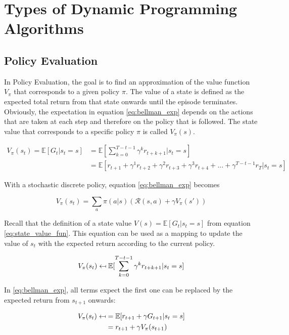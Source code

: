 \section{Types of Dynamic Programming Algorithms}

\subsection{Policy Evaluation}
\label{subsection:policy_evaluation}

In Policy Evaluation, the goal is to find an approximation of the value function $V_\pi$ that corresponds to a given policy $\pi$. The value of a state is defined as the expected total return from that state onwards until the episode terminates. Obviously, the expectation in equation \ref{eq:bellman_exp} depends on the actions that are taken at each step and therefore on the policy that is followed. The state value that corresponds to a specific policy $\pi$ is called $V_\pi(s)$.

\begin{align}
V_\pi(s_t)=\mathbb{E}[G_t|s_t=s] &= \mathbb{E}\left[ \sum_{k=0}^{T-t-1}\gamma^k r_{t+k+1}|s_t=s\right] \\
&=\mathbb{E}[r_{t+1}+\gamma^1 r_{t+2}+\gamma^2 r_{t+3}+\gamma^3 r_{t+4}+...+\gamma^{T-t-1}r_T|s_t=s]
\label{eq:bellman_exp}
\end{align}

With a stochastic discrete policy, equation \ref{eq:bellman_exp} becomes

\begin{equation}
V_\pi(s_t)=\sum_{a}\pi(a|s)(\mathcal{R}(s,a)+\gamma V_\pi(s'))
\label{eq:bellman_exp_discrete_policy}
\end{equation}

Recall that the definition of a state value $V(s) = \mathbb{E}[G_t|s_t=s]$ from equation \ref{eq:state_value_fun}. This equation can be used as a mapping to update the value of $s_t$ with the expected return according to the current policy.

\begin{equation}
V_\pi(s_t) \mathrel{\reflectbox{\ensuremath{\mapsto}}} \mathbb{E}[ \sum_{k=0}^{T-t-1}\gamma^k r_{t+k+1}|s_t=s]
\label{eq:bellman_exp_update}
\end{equation}

In \ref{eq:bellman_exp}, all terms expect the first one can be replaced by the expected return from $s_{t+1}$ onwards:

\begin{align}
V_\pi(s_t) \mathrel{\reflectbox{\ensuremath{\mapsto}}} 
&=\mathbb{E}[r_{t+1}+\gamma G_{t+1}|s_t=s]\\
&=r_{t+1}+\gamma V_\pi(s_{t+1})
\label{eq:bellman_exp_update_bootstrapped}
\end{align}


